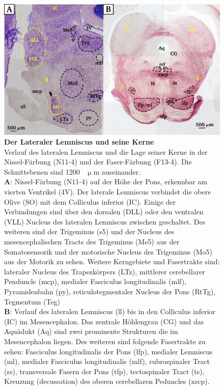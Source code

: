 \documentclass[12pt,a4paper,pdftex]{article}
\begin{document}
\begin{figure}[H]
    \centering
    \includegraphics[width = \textwidth]{pictures/auditory/lateral_lemniscus.png}
    \caption[Der Lateraler Lemniscus und seine Kerne]{\textbf{Der Lateraler Lemniscus und seine Kerne}\\ 
    Verlauf des lateralen Lemniscus und die Lage seiner Kerne in der Nissel-Färbung (N11-4) und der Faser-Färbung (F13-4). Die Schnittebenen sind 1200~ $\upmu$m auseinander.\\
    \textbf{A}: Nissel-Färbung (N11-4) auf der Höhe der Pons, erkennbar am vierten Ventrikel (4V).
    Der laterale Lemniscus verbindet die obere Olive (SO) mit dem Colliculus inferior (IC). Einige der Verbindungen sind über den dorsalen (DLL) oder den ventralen (VLL) Nucleus des lateralen Lemniscus zwischen geschaltet. 
    Des weiteren sind der Trigeminus (s5) und der Nucleus des mesencephalischen Tracts des Trigeminus (Me5) aus der Somatosensorik und der motorische Nucleus des Trigeminus (Mo5) aus der Motorik zu sehen. 
    Weitere Kerngebiete und Fasertrakte sind: lateraler Nucleus des Trapezkörpers (LTz), mittlerer cerebellarer Penduncle (mcp), medialer Fasciculus longitudinalis (mlf), Pyramidenbahn (py), reticulotegmentaler Nucleus der Pons (RtTg), Tegmentum (Teg)\\
    \textbf{B}: Verlauf des lateralen Lemniscus (ll) bis in den Colliculus inferior (IC) im Mesencephalon. Das zentrale Höhlengrau (CG) und das Aquädukt (Aq) sind zwei prominente Strukturen die im Mesencephalon liegen. Des weiteren sind folgende Fasertrakte zu sehen: Fasciculus longitudinalis der Pons (lfp), medialer Lemniscus (ml), medialer Fasciculus longitudinalis (mlf), rubrospinaler Tract (rs), transversale Fasern der Pons (tfp), tectospinaler Tract (ts), Kreuzung (decussation) des oberen cerebellaren Peduncles (xscp).}
    \label{fig:lateraler_lemniscus}
\end{figure}
\end{document}
